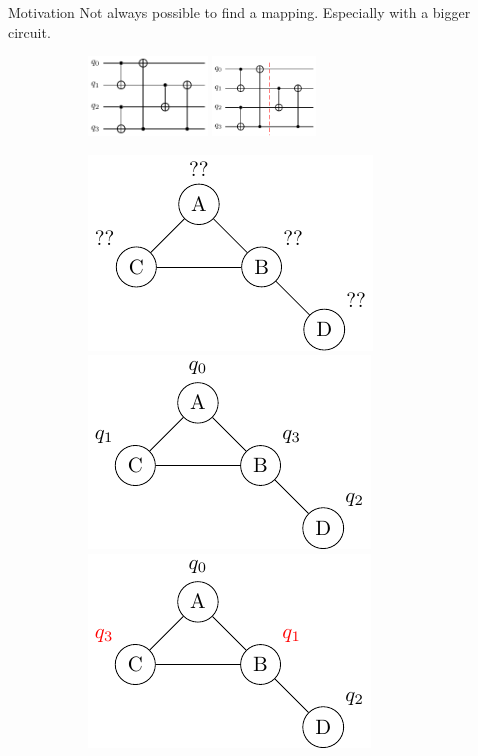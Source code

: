 \documentclass{beamer}
\begin{document}
\begin{frame}{Motivation}
Not always possible to find a mapping. Especially with a bigger circuit.\\
\pause
\begin{figure}
     \centering
     \begin{subfigure}[b]{0.45\textwidth}
		\begin{overprint}
		\centering
		\includegraphics[height=60pt]{figures/extended_circuit}
		\onslide<3->\centering
		\includegraphics[height=60pt]{figures/default_circuit3}
		\end{overprint}
     \end{subfigure}
     \hfill %
     \begin{subfigure}[b]{0.45\textwidth}
		\begin{overprint}
		\centering
		\includegraphics[scale=0.6]{figures/chip_unmapped}
		\onslide<4>\centering
		\includegraphics[scale=0.6]{figures/default_mapped}
		\onslide<5>\centering
		\includegraphics[scale=0.6]{figures/default_mapped2}

\end{overprint}
\end{subfigure}
\end{figure}
\end{frame}
\end{document}
